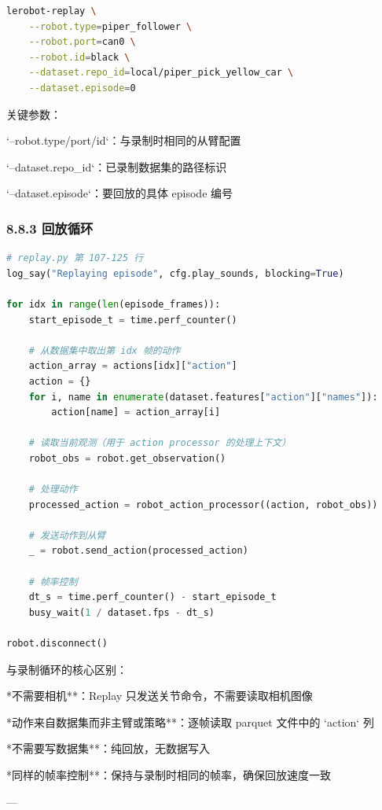 \documentclass[UTF8,a4paper,11pt]{ctexart}
\begin{document}
{\begin{lstlisting}[language=bash]
lerobot-replay \
    --robot.type=piper_follower \
    --robot.port=can0 \
    --robot.id=black \
    --dataset.repo_id=local/piper_pick_yellow_car \
    --dataset.episode=0
\end{lstlisting}

关键参数：
\item `--robot.type/port/id`：与录制时相同的从臂配置
\item `--dataset.repo_id`：已录制数据集的路径标识
\item `--dataset.episode`：要回放的具体 episode 编号

\subsubsection{8.8.3 回放循环}

\begin{lstlisting}[language=python]
# replay.py 第 107-125 行
log_say("Replaying episode", cfg.play_sounds, blocking=True)

for idx in range(len(episode_frames)):
    start_episode_t = time.perf_counter()

    # 从数据集中取出第 idx 帧的动作
    action_array = actions[idx]["action"]
    action = {}
    for i, name in enumerate(dataset.features["action"]["names"]):
        action[name] = action_array[i]

    # 读取当前观测（用于 action processor 的处理上下文）
    robot_obs = robot.get_observation()

    # 处理动作
    processed_action = robot_action_processor((action, robot_obs))

    # 发送动作到从臂
    _ = robot.send_action(processed_action)

    # 帧率控制
    dt_s = time.perf_counter() - start_episode_t
    busy_wait(1 / dataset.fps - dt_s)

robot.disconnect()
\end{lstlisting}

与录制循环的核心区别：
\item **不需要相机**：Replay 只发送关节命令，不需要读取相机图像
\item **动作来自数据集而非主臂或策略**：逐帧读取 parquet 文件中的 `action` 列
\item **不需要写数据集**：纯回放，无数据写入
\item **同样的帧率控制**：保持与录制时相同的帧率，确保回放速度一致

---

}
\end{document}
